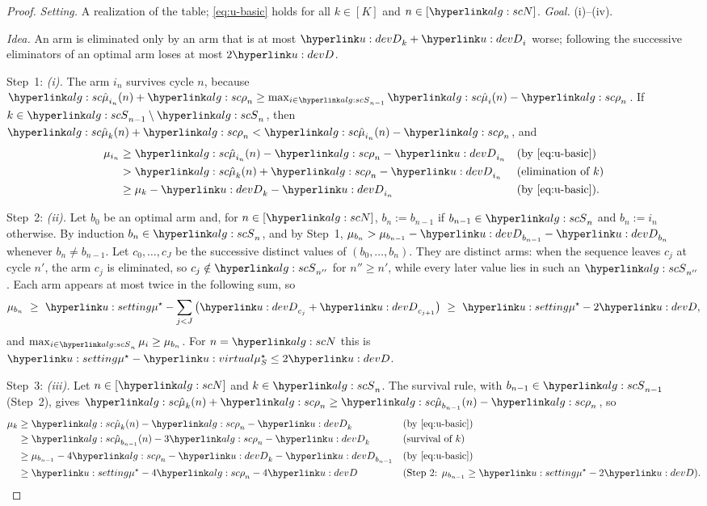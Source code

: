 \documentclass[11pt]{article}
\newcommand{\1}{\mathbf{1}}
\begin{document}
\begin{proof}
\textit{Setting.} A realization of the table; \eqref{eq:u-basic} holds for all $k\in[K]$ and $n\in[\uN]$. \textit{Goal.} (i)--(iv).

\textit{Idea.} An arm is eliminated only by an arm that is at most $\uD_k+\uD_i$ worse; following the successive eliminators of an optimal arm loses at most $2\uD$.

Step~1: \emph{(i).} The arm $i_n$ survives cycle $n$, because $\umuh_{i_n}(n)+\urho_n\ge\max_{i\in\uS_{n-1}}\umuh_i(n)-\urho_n$. If $k\in\uS_{n-1}\setminus\uS_n$,
then $\umuh_k(n)+\urho_n<\umuh_{i_n}(n)-\urho_n$, and
\begin{align*}
\mu_{i_n}&\ge\umuh_{i_n}(n)-\urho_n-\uD_{i_n} &&\text{(by \eqref{eq:u-basic})}\\
&>\umuh_k(n)+\urho_n-\uD_{i_n} &&\text{(elimination of $k$)}\\
&\ge\mu_k-\uD_k-\uD_{i_n} &&\text{(by \eqref{eq:u-basic})}.
\end{align*}

Step~2: \emph{(ii).} Let $b_0$ be an optimal arm and, for $n\in[\uN]$, $b_n:=b_{n-1}$ if $b_{n-1}\in\uS_n$ and $b_n:=i_n$ otherwise. By induction $b_n\in\uS_n$, and
by Step~1, $\mu_{b_n}>\mu_{b_{n-1}}-\uD_{b_{n-1}}-\uD_{b_n}$ whenever $b_n\ne b_{n-1}$. Let $c_0,\dots,c_J$ be the successive distinct values of
$(b_0,\dots,b_n)$. They are distinct arms: when the sequence leaves $c_j$ at cycle $n'$, the arm $c_j$ is eliminated, so $c_j\notin\uS_{n''}$ for $n''\ge n'$,
while every later value lies in such an $\uS_{n''}$. Each arm appears at most twice in the following sum, so
\[
\mu_{b_n}\ \ge\ \umus-\sum_{j<J}\big(\uD_{c_j}+\uD_{c_{j+1}}\big)\ \ge\ \umus-2\uD ,
\]
and $\max_{i\in\uS_n}\mu_i\ge\mu_{b_n}$. For $n=\uN$ this is $\umus-\umusS\le2\uD$.

Step~3: \emph{(iii).} Let $n\in[\uN]$ and $k\in\uS_n$. The survival rule, with $b_{n-1}\in\uS_{n-1}$ (Step~2), gives $\umuh_k(n)+\urho_n\ge\umuh_{b_{n-1}}(n)-\urho_n$, so
\begin{align*}
\mu_k&\ge\umuh_k(n)-\urho_n-\uD_k &&\text{(by \eqref{eq:u-basic})}\\
&\ge\umuh_{b_{n-1}}(n)-3\urho_n-\uD_k &&\text{(survival of $k$)}\\
&\ge\mu_{b_{n-1}}-4\urho_n-\uD_k-\uD_{b_{n-1}} &&\text{(by \eqref{eq:u-basic})}\\
&\ge\umus-4\urho_n-4\uD &&\text{(Step~2: $\mu_{b_{n-1}}\ge\umus-2\uD$)}.
\end{align*}


\end{proof}
\end{document}
